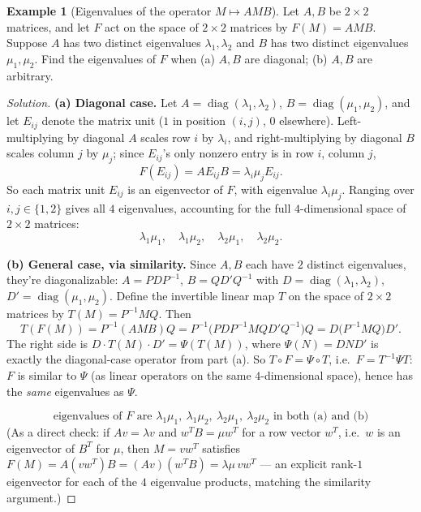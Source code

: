 \documentclass[11pt]{article}
\theoremstyle{definition}
\newtheorem{example}{Example}[section]
\newcommand{\diag}{\operatorname{diag}}
\begin{document}
\begin{example}[Eigenvalues of the operator $M\mapsto AMB$]
Let $A,B$ be $2\times2$ matrices, and let $F$ act on the space of $2\times2$ matrices by $F(M)=AMB$. Suppose $A$ has two distinct eigenvalues $\lambda_1,\lambda_2$ and $B$ has two distinct eigenvalues $\mu_1,\mu_2$. Find the eigenvalues of $F$ when (a) $A,B$ are diagonal; (b) $A,B$ are arbitrary.
\end{example}
\begin{proof}[Solution]
\textbf{(a) Diagonal case.} Let $A=\diag(\lambda_1,\lambda_2)$, $B=\diag(\mu_1,\mu_2)$, and let $E_{ij}$ denote the matrix unit ($1$ in position $(i,j)$, $0$ elsewhere). Left-multiplying by diagonal $A$ scales row $i$ by $\lambda_i$, and right-multiplying by diagonal $B$ scales column $j$ by $\mu_j$; since $E_{ij}$'s only nonzero entry is in row $i$, column $j$,
\[
F(E_{ij})=AE_{ij}B=\lambda_i\mu_j E_{ij}.
\]
So each matrix unit $E_{ij}$ is an eigenvector of $F$, with eigenvalue $\lambda_i\mu_j$. Ranging over $i,j\in\{1,2\}$ gives all $4$ eigenvalues, accounting for the full $4$-dimensional space of $2\times2$ matrices:
\[
\lambda_1\mu_1,\quad\lambda_1\mu_2,\quad\lambda_2\mu_1,\quad\lambda_2\mu_2.
\]

\textbf{(b) General case, via similarity.} Since $A,B$ each have $2$ distinct eigenvalues, they're diagonalizable: $A=PDP^{-1}$, $B=QD'Q^{-1}$ with $D=\diag(\lambda_1,\lambda_2)$, $D'=\diag(\mu_1,\mu_2)$. Define the invertible linear map $T$ on the space of $2\times2$ matrices by $T(M)=P^{-1}MQ$. Then
\[
T(F(M))=P^{-1}(AMB)Q=P^{-1}\bigl(PDP^{-1}MQD'Q^{-1}\bigr)Q=D\bigl(P^{-1}MQ\bigr)D'.
\]
The right side is $D\cdot T(M)\cdot D'=\Psi(T(M))$,
where $\Psi(N)=DND'$ is exactly the diagonal-case operator from part (a). So $T\circ F=\Psi\circ T$, i.e.\ $F=T^{-1}\Psi T$: $F$ is similar to $\Psi$ (as linear operators on the same $4$-dimensional space), hence has the \emph{same} eigenvalues as $\Psi$.

\[
\boxed{\text{eigenvalues of }F\text{ are }\lambda_1\mu_1,\ \lambda_1\mu_2,\ \lambda_2\mu_1,\ \lambda_2\mu_2\text{ in both (a) and (b)}}
\]
(As a direct check: if $Av=\lambda v$ and $w^TB=\mu w^T$ for a row vector $w^T$, i.e.\ $w$ is an eigenvector of $B^T$ for $\mu$, then $M=vw^T$ satisfies $F(M)=A(vw^T)B=(Av)(w^TB)=\lambda\mu\,vw^T$ — an explicit rank-$1$ eigenvector for each of the $4$ eigenvalue products, matching the similarity argument.)
\end{proof}
\end{document}
